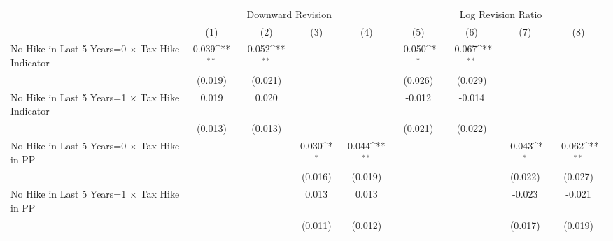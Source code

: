 {
\def\sym#1{\ifmmode^{#1}\else\(^{#1}\)\fi}
\begin{tabular}{l*{8}{c}}
\toprule
                    &\multicolumn{4}{c}{Downward Revision}                                                  &\multicolumn{4}{c}{Log Revision Ratio}                                                 \\\cmidrule(lr){2-5}\cmidrule(lr){6-9}
                    &\multicolumn{1}{c}{(1)}         &\multicolumn{1}{c}{(2)}         &\multicolumn{1}{c}{(3)}         &\multicolumn{1}{c}{(4)}         &\multicolumn{1}{c}{(5)}         &\multicolumn{1}{c}{(6)}         &\multicolumn{1}{c}{(7)}         &\multicolumn{1}{c}{(8)}         \\
\midrule
No Hike in Last 5 Years=0 $\times$ Tax Hike Indicator&       0.039\sym{**} &       0.052\sym{**} &                     &                     &      -0.050\sym{*}  &      -0.067\sym{**} &                     &                     \\
                    &     (0.019)         &     (0.021)         &                     &                     &     (0.026)         &     (0.029)         &                     &                     \\
No Hike in Last 5 Years=1 $\times$ Tax Hike Indicator&       0.019         &       0.020         &                     &                     &      -0.012         &      -0.014         &                     &                     \\
                    &     (0.013)         &     (0.013)         &                     &                     &     (0.021)         &     (0.022)         &                     &                     \\
No Hike in Last 5 Years=0 $\times$ Tax Hike in PP&                     &                     &       0.030\sym{*}  &       0.044\sym{**} &                     &                     &      -0.043\sym{*}  &      -0.062\sym{**} \\
                    &                     &                     &     (0.016)         &     (0.019)         &                     &                     &     (0.022)         &     (0.027)         \\
No Hike in Last 5 Years=1 $\times$ Tax Hike in PP&                     &                     &       0.013         &       0.013         &                     &                     &      -0.023         &      -0.021         \\
                    &                     &                     &     (0.011)         &     (0.012)         &                     &                     &     (0.017)         &     (0.019)         \\

\end{tabular}}
